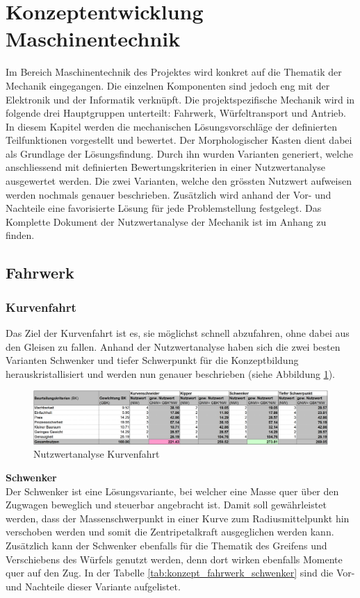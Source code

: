 \documentclass[../../main.tex]{subfiles}
\begin{document}
    \section{Konzeptentwicklung Maschinentechnik}
    Im Bereich Maschinentechnik des Projektes wird konkret auf die Thematik der Mechanik eingegangen. Die einzelnen Komponenten sind jedoch eng mit der Elektronik und der Informatik verknüpft. Die projektspezifische Mechanik wird in folgende drei Hauptgruppen unterteilt: Fahrwerk, Würfeltransport und Antrieb. In diesem Kapitel werden die mechanischen Lösungsvorschläge der definierten Teilfunktionen vorgestellt und bewertet. Der Morphologischer Kasten dient dabei als Grundlage der Lösungsfindung. Durch ihn wurden Varianten generiert, welche anschliessend mit definierten Bewertungskriterien in einer Nutzwertanalyse ausgewertet werden. Die zwei Varianten, welche den grössten Nutzwert aufweisen werden nochmals genauer beschrieben. Zusätzlich wird anhand der Vor- und Nachteile eine favorisierte Lösung für jede Problemstellung festgelegt. Das Komplette Dokument der Nutzwertanalyse der Mechanik ist im Anhang zu finden.

    \subsection{Fahrwerk}
    \subsubsection{Kurvenfahrt}
    Das Ziel der Kurvenfahrt ist es, sie möglichst schnell abzufahren, ohne dabei aus den Gleisen zu fallen. Anhand der Nutzwertanalyse haben sich die zwei besten Varianten Schwenker und tiefer Schwerpunkt für die Konzeptbildung herauskristallisiert und werden nun genauer beschrieben (siehe Abbildung \ref{fig:Kurvenfahrt}).

    \begin{figure}[H] %
        \centering
        \includegraphics[width=1\textwidth]{Kurvenfahrt}
        \caption{Nutzwertanalyse Kurvenfahrt}
        \label{fig:Kurvenfahrt}
    \end{figure}
    
    \textbf{Schwenker}\\
    Der Schwenker ist eine Lösungsvariante, bei welcher eine Masse quer über den Zugwagen beweglich und steuerbar angebracht ist. Damit soll gewährleistet werden, dass der Massenschwerpunkt in einer Kurve zum Radiusmittelpunkt hin verschoben werden und somit die Zentripetalkraft ausgeglichen werden kann. Zusätzlich kann der Schwenker ebenfalls für die Thematik des Greifens und Verschiebens des Würfels genutzt werden, denn dort wirken ebenfalls Momente quer auf den Zug. In der Tabelle \ref{tab:konzept_fahrwerk_schwenker} sind die Vor- und Nachteile dieser Variante aufgelistet.
    
\end{document}
